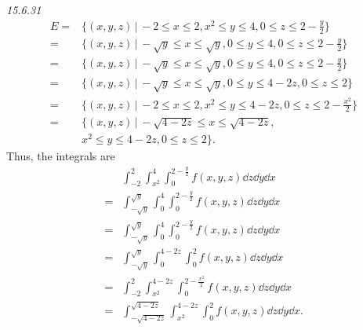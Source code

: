 \documentclass[8pt,twocolumn]{article}
\begin{document}
\begin{Answer}[number=20]
  \emph{15.6.31}
  \begin{align*}
    E =&  \{ (x,y,z) \, \big\vert \, -2 \le x \le 2, x^2 \le y \le 4,  0 \le z \le 2-\frac{y}{2} \} \\
    = &\{ (x,y,z) \, \big\vert \, -\sqrt{y} \le x\le \sqrt{y}, 0 \le y \le 4, 0 \le z \le 2-\frac{y}{2} \} \\
    = &\{ (x,y,z) \, \big\vert \, -\sqrt{y} \le x\le \sqrt{y}, 0 \le y \le 4, 0 \le z \le 2-\frac{y}{2} \} \\
    = &\{ (x,y,z) \, \big\vert \, -\sqrt{y} \le x\le \sqrt{y}, 0 \le y \le 4-2z, 0 \le z \le 2 \} \\
    = &\{ (x,y,z) \, \big\vert \, -2 \le x \le 2, x^2 \le y \le 4-2z, 0 \le z \le 2-\frac{x^2}{2} \} \\
    = &\{ (x,y,z) \, \big\vert \, -\sqrt{4-2z} \le x\le \sqrt{4-2z},\\ &x^2 \le y \le
    4-2z, 0 \le z \le 2 \}.
  \end{align*}
  Thus, the integrals are
  \begin{align*}
    &\int_{-2}^2 \int_{x^2}^4
    \int_0^{2-\frac{y}{2}} f(x,y,z) \dd{z}\dd{y}\dd{x} \\
 = &\int_{-\sqrt{y}}^{\sqrt{y}} \int_0^4 \int_0^{2-\frac{y}{2}} f(x,y,z)\dd{z}\dd{y}\dd{x} \\
 = &\int_{-\sqrt{y}}^{\sqrt{y}} \int_0^4 \int_0^{2-\frac{y}{2}} f(x,y,z)\dd{z}\dd{y}\dd{x} \\
 = &\int_{-\sqrt{y}}^{\sqrt{y}} \int_0^{4-2z} \int_0^2 f(x,y,z) \dd{z}\dd{y}\dd{x} \\
 = &\int_{-2}^2 \int_{x^2}^{4-2z} \int_0^{2-\frac{x^2}{2}} f(x,y,z) \dd{z}\dd{y}\dd{x} \\
 = &\int_{-\sqrt{4-2z}}^{\sqrt{4-2z}} \int_{x^2}^{4-2z} \int_0^2 f(x,y,z) \dd{z}\dd{y}\dd{x}.
  \end{align*}
\end{Answer}
\end{document}
